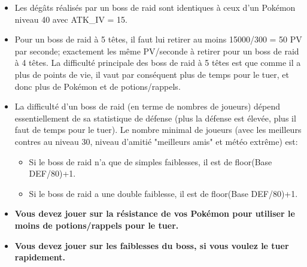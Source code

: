 \documentclass[12pt]{beamer}
\begin{document}
\begin{frame}
\begin{block}{}
\begin{footnotesize}
\begin{itemize}
  \item Les dégâts réalisés par un boss de raid sont identiques à ceux d'un Pok\'emon niveau 40 avec ATK\_IV = 15.
  \item Pour un boss de raid à 5 têtes, il faut lui retirer au moins 15000/300 = 50 PV par seconde; exactement les même PV/seconde à retirer pour un boss de raid à 4 têtes. La difficulté principale des boss de raid à 5 têtes est que comme il a plus de points de vie, il vaut par conséquent plus de temps pour le tuer, et donc plus de Pok\'emon et de potions/rappels.
  \item La difficulté d'un boss de raid (en terme de nombres de joueurs) dépend essentiellement de sa statistique de défense (plus la défense est élevée, plus il faut de temps pour le tuer). Le nombre minimal de joueurs (avec les meilleurs contres au niveau 30, niveau d'amitié "meilleurs amis" et météo extrême) est:
\begin{itemize}
  \item \footnotesize Si le boss de raid n'a que de simples faiblesses, il est de floor(Base DEF/80)+1.
  \item \footnotesize Si le boss de raid a une double faiblesse, il est de floor(Base DEF/80)+1.
\end{itemize}
  
  \item \textbf{Vous devez jouer sur la résistance de vos Pok\'emon pour utiliser le moins de potions/rappels pour le tuer.}
  \item \textbf{Vous devez jouer sur les faiblesses du boss, si vous voulez le tuer rapidement.}
\end{itemize}

\end{footnotesize}
\end{block}
\end{frame}
\end{document}
